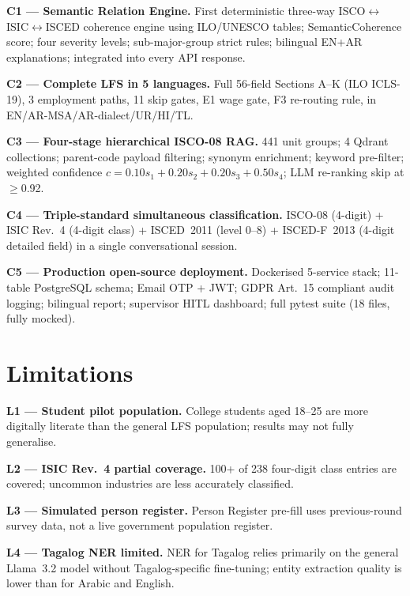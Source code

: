 \noindent\textbf{C1 --- Semantic Relation Engine.}
First deterministic three-way ISCO$\leftrightarrow$ISIC$\leftrightarrow$ISCED
coherence engine using ILO/UNESCO tables; SemanticCoherence score; four
severity levels; sub-major-group strict rules; bilingual EN+AR explanations;
integrated into every API response.

\noindent\textbf{C2 --- Complete LFS in 5 languages.}
Full 56-field Sections A--K (ILO ICLS-19), 3 employment paths, 11 skip gates,
E1 wage gate, F3 re-routing rule, in EN/AR-MSA/AR-dialect/UR/HI/TL.

\noindent\textbf{C3 --- Four-stage hierarchical ISCO-08 RAG.}
441 unit groups; 4 Qdrant collections; parent-code payload filtering; synonym
enrichment; keyword pre-filter; weighted confidence
$c = 0.10s_1 + 0.20s_2 + 0.20s_3 + 0.50s_4$; LLM re-ranking skip at
$\geq$0.92.

\noindent\textbf{C4 --- Triple-standard simultaneous classification.}
ISCO-08 (4-digit) + ISIC Rev.~4 (4-digit class) + ISCED~2011 (level 0--8) +
ISCED-F~2013 (4-digit detailed field) in a single conversational session.

\noindent\textbf{C5 --- Production open-source deployment.}
Dockerised 5-service stack; 11-table PostgreSQL schema; Email OTP + JWT;
GDPR Art.~15 compliant audit logging; bilingual report; supervisor HITL
dashboard; full pytest suite (18 files, fully mocked).

\section{Limitations}
\label{sec:conc-limitations}

\noindent\textbf{L1 --- Student pilot population.}
College students aged 18--25 are more digitally literate than the general LFS
population; results may not fully generalise.

\noindent\textbf{L2 --- ISIC Rev.~4 partial coverage.}
100+ of 238 four-digit class entries are covered; uncommon industries are less
accurately classified.

\noindent\textbf{L3 --- Simulated person register.}
Person Register pre-fill uses previous-round survey data, not a live
government population register.

\noindent\textbf{L4 --- Tagalog NER limited.}
NER for Tagalog relies primarily on the general Llama~3.2 model without
Tagalog-specific fine-tuning; entity extraction quality is lower than for
Arabic and English.

